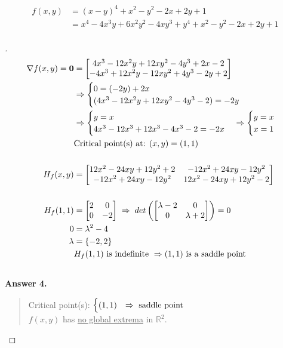 \documentclass[12pt]{article}
\newenvironment{exercise}[2][Exercise]{\begin{trivlist}
\item[\hskip \labelsep {\bfseries #1}\hskip \labelsep {\bfseries #2.}]}{\end{trivlist}}
\begin{document}
\begin{exercise}{4}
	\begin{align*}
		f(x,y) &= (x - y)^4 + x^2 - y^2 - 2x + 2y + 1 \\
		 &= x^4 - 4x^3y + 6x^2y^2 - 4xy^3 + y^4 + x^2 - y^2 - 2x + 2y + 1 \\
	\end{align*}
\end{exercise}
\begin{proof}[]
	\begin{align*}
		\nabla f(x,y) = \bm{0} &= \begin{bmatrix} 4x^3 - 12x^2y + 12xy^2 - 4y^3 + 2x - 2 \\ -4x^3 + 12x^2y - 12xy^2 + 4y^3 - 2y + 2 \end{bmatrix} \\
		&\Rightarrow
		\begin{cases} 0 = (-2y) + 2x \\ (4x^3 - 12x^2y + 12xy^2 - 4y^3 - 2) = -2y \end{cases} \\
		& \Rightarrow
		\begin{cases} y = x \\ 4x^3 - 12x^3 + 12x^3 - 4x^3 - 2 = -2x\end{cases}
		\Rightarrow
		\begin{cases} y = x \\ x = 1 \end{cases}  \\
		& \textnormal{Critical point(s) at: } (x,y) = (1, 1) \\[15pt]
		H_f(x,y) &= \begin{bmatrix} 12x^2 - 24xy + 12y^2 + 2 & -12x^2 + 24xy - 12y^2 \\ -12x^2 + 24xy - 12y^2 & 12x^2 - 24xy + 12y^2 - 2 \end{bmatrix} \\[15pt]
		H_f(1, 1) &= \begin{bmatrix} 2 & 0 \\ 0 & -2 \end{bmatrix} \; \Rightarrow \; det\left( \begin{bmatrix} \lambda -2 & 0 \\ 0 & \lambda + 2 \end{bmatrix} \right) = 0 \\
		0 &= \lambda^2 - 4 \\
		\lambda &= \left\lbrace -2, 2 \right\rbrace \\
		& H_f(1, 1) \textnormal{ is indefinite } \Rightarrow (1, 1) \textnormal{ is a saddle point} \\[15pt]
	\end{align*}
	\textbf{Answer 4.} \vspace{-5mm} \\
	\begin{quote}
		Critical point(s): $ \begin{cases}
		(1, 1) & \Rightarrow \textnormal{ saddle point} \\
		\end{cases}	$ \\
		$f(x,y)$ has \underline{no global extrema} in $\mathbb{R}^2$.
	\end{quote}
\end{proof}
\end{document}

